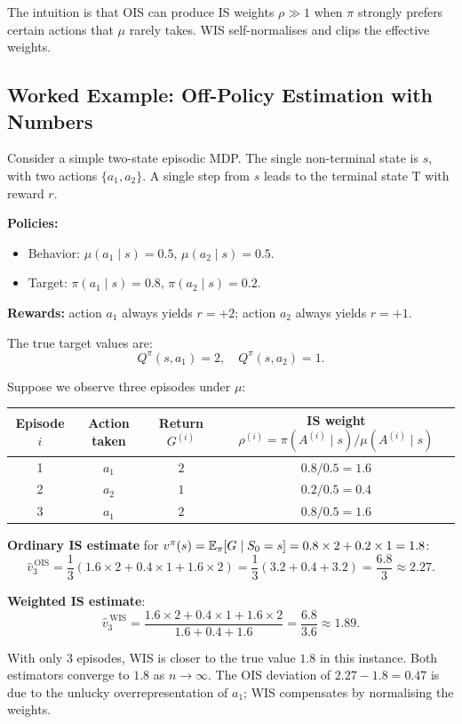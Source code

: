 The intuition is that OIS can produce IS weights $\rho \gg 1$ when $\pi$ strongly prefers certain actions that $\mu$ rarely takes.  WIS self-normalises and clips the effective weights.

\subsection*{Worked Example: Off-Policy Estimation with Numbers}

\begin{example}
\label{ex:offpolicy-numerical}
Consider a simple two-state episodic MDP.  The single non-terminal state is $s$, with two actions $\{a_1, a_2\}$.  A single step from $s$ leads to the terminal state $\mathrm{T}$ with reward $r$.

\medskip
\noindent
\textbf{Policies:}
\begin{itemize}[leftmargin=*]
  \item Behavior: $\mu(a_1 \mid s) = 0.5$, $\mu(a_2 \mid s) = 0.5$.
  \item Target: $\pi(a_1 \mid s) = 0.8$, $\pi(a_2 \mid s) = 0.2$.
\end{itemize}
\textbf{Rewards:} action $a_1$ always yields $r=+2$; action $a_2$ always yields $r=+1$.

\medskip
\noindent
The true target values are:
\[
  Q^\pi(s, a_1) = 2, \quad Q^\pi(s, a_2) = 1.
\]

\noindent
Suppose we observe three episodes under $\mu$:
\begin{center}
\begin{tabular}{@{}cccc@{}}
\toprule
Episode $i$ & Action taken & Return $G^{(i)}$ & IS weight $\rho^{(i)} = \pi(A^{(i)}\mid s)/\mu(A^{(i)}\mid s)$ \\
\midrule
1 & $a_1$ & $2$ & $0.8/0.5 = 1.6$ \\
2 & $a_2$ & $1$ & $0.2/0.5 = 0.4$ \\
3 & $a_1$ & $2$ & $0.8/0.5 = 1.6$ \\
\bottomrule
\end{tabular}
\end{center}

\noindent
\textbf{Ordinary IS estimate} for $v^\pi(s) = \operatorname{\mathbb{E}}_\pi[G \mid S_0 = s] = 0.8 \times 2 + 0.2 \times 1 = 1.8$:
\[
  \widehat{v}^{\,\mathrm{OIS}}_3 = \frac{1}{3}(1.6 \times 2 + 0.4 \times 1 + 1.6 \times 2) = \frac{1}{3}(3.2 + 0.4 + 3.2) = \frac{6.8}{3} \approx 2.27.
\]

\noindent
\textbf{Weighted IS estimate}:
\[
  \widehat{v}^{\,\mathrm{WIS}}_3 = \frac{1.6 \times 2 + 0.4 \times 1 + 1.6 \times 2}{1.6 + 0.4 + 1.6} = \frac{6.8}{3.6} \approx 1.89.
\]

\noindent
With only 3 episodes, WIS is closer to the true value $1.8$ in this instance.  Both estimators converge to $1.8$ as $n \to \infty$.  The OIS deviation of $2.27 - 1.8 = 0.47$ is due to the unlucky overrepresentation of $a_1$; WIS compensates by normalising the weights.
\end{example}

